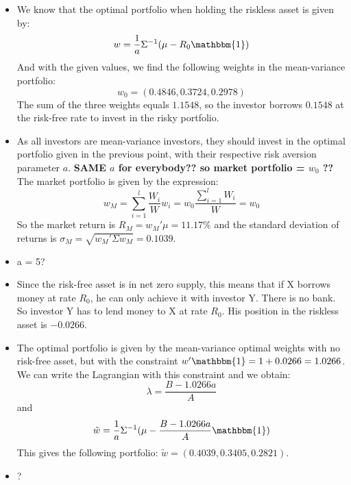 \documentclass[10pt]{article}
\newenvironment{exercise}[2][Exercise]{\begin{trivlist}
  \item[\hskip \labelsep {\bfseries #1}\hskip \labelsep {\bfseries #2.}]}{\end{trivlist}}
\begin{document}
\begin{exercise}{4} 
	
\begin{itemize}
	\item We know that the optimal portfolio when holding the riskless asset is given by: $$ w = \frac{1}{a}\Sigma^{-1}(\mu-R_0\mathbbm{1})$$
	And with the given values, we find the following weights in the mean-variance portfolio: $$ w_0 = (0.4846,0.3724,0.2978)$$ The sum of the three weights equals $1.1548$, so the investor borrows $0.1548$ at the risk-free rate to invest in the risky portfolio. 
	\item As all investors are mean-variance investors, they should invest in the optimal portfolio given in the previous point, with their respective risk aversion parameter $a$. \textbf{SAME $a$ for everybody?? so market portfolio = $w_0$ ?? }
	The market portfolio is given by the expression: 
	$$w_M = \sum_{i=1}^l{\frac{W_i}{W}w_i} = w_0\frac{\sum_{i=1}^l{W_i}}{W} = w_0$$
	So the market return is $R_M = w_M'\mu = 11.17\%$ and the standard deviation of returns is $\sigma_M = \sqrt{w_M'\Sigma w_M} = 0.1039$.
	\item a = 5?
	\item Since the risk-free asset is in net zero supply, this means that if X borrows money at rate $R_0$, he can only achieve it with investor Y. There is no bank. So investor Y has to lend money to X at rate $R_0$. His position in the riskless asset is $-0.0266$.  
	\item The optimal portfolio is given by the mean-variance optimal weights with no risk-free asset, but with the constraint $w'\mathbbm{1} = 1 + 0.0266 = 1.0266$.
	We can write the Lagrangian with this constraint and we obtain:
	$$ \lambda = \frac{B - 1.0266a}{A} $$ and
	$$ \tilde{w} = \frac{1}{a}\Sigma^{-1}(\mu-\frac{B-1.0266a}{A}\mathbbm{1})$$
	This gives the following portfolio: $\tilde{w} = (0.4039,0.3405,0.2821)$.
	\item ?
\end{itemize}
\end{exercise}
  
\end{document}
